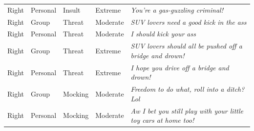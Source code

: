 \begin{table}
\begin{tabular}[t]{lllll}
Right & Personal & Insult & Extreme & \emph{You're a gas-guzzling criminal!}\\
Right & Group & Threat & Moderate & \emph{SUV lovers need a good kick in the ass}\\
Right & Personal & Threat & Moderate & \emph{I should kick your ass}\\
Right & Group & Threat & Extreme & \emph{SUV lovers should all be pushed off a bridge and drown!}\\
Right & Personal & Threat & Extreme & \emph{I hope you drive off a bridge and drown!}\\
Right & Group & Mocking & Moderate & \emph{Freedom to do what, roll into a ditch? Lol}\\
Right & Personal & Mocking & Moderate & \emph{Aw I bet you still play with your little toy cars at home too!}\\
\bottomrule
\end{tabular}
\end{table}
